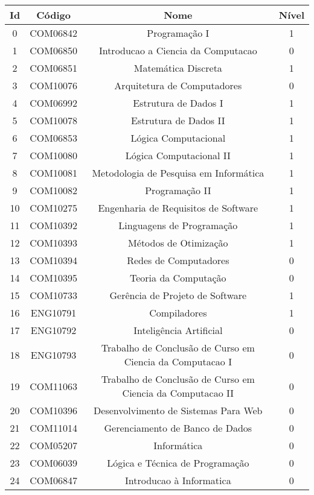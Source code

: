 \begin{apendices}
{\footnotesize
\begin{longtable}{|c|c|c|c|}
\hline
\textbf{Id} & \textbf{Código} & \textbf{Nome} & \textbf{Nível} \\ \hline
0 & COM06842 & Programação I & 1 \\ \hline
1 & COM06850 & Introducao a Ciencia da Computacao & 0 \\ \hline
2 & COM06851 & Matemática Discreta & 1 \\ \hline
3 & COM10076 & Arquitetura de Computadores & 0 \\ \hline
4 & COM06992 & Estrutura de Dados I & 1 \\ \hline
5 & COM10078 & Estrutura de Dados II & 1 \\ \hline
6 & COM06853 & Lógica Computacional & 1 \\ \hline
7 & COM10080 & Lógica Computacional II & 1 \\ \hline
8 & COM10081 & Metodologia de Pesquisa em Informática & 1 \\ \hline
9 & COM10082 & Programação II & 1 \\ \hline
10 & COM10275 & Engenharia de Requisitos de Software & 1 \\ \hline
11 & COM10392 & Linguagens de Programação & 1 \\ \hline
12 & COM10393 & Métodos de Otimização & 1 \\ \hline
13 & COM10394 & Redes de Computadores & 0 \\ \hline
14 & COM10395 & Teoria da Computação & 0 \\ \hline
15 & COM10733 & Gerência de Projeto de Software & 1 \\ \hline
16 & ENG10791 & Compiladores & 1 \\ \hline
17 & ENG10792 & Inteligência Artificial & 0 \\ \hline
18 & ENG10793 & Trabalho de Conclusão de Curso em Ciencia da Computacao I & 0 \\ \hline
19 & COM11063 & Trabalho de Conclusão de Curso em Ciencia da Computacao II & 0 \\ \hline
20 & COM10396 & Desenvolvimento de Sistemas Para Web & 0 \\ \hline
21 & COM11014 & Gerenciamento de Banco de Dados & 0 \\ \hline
22 & COM05207 & Informática & 0 \\ \hline
23 & COM06039 & Lógica e Técnica de Programação & 0 \\ \hline
24 & COM06847 & Introducao à Informatica & 0 \\ \hline

\end{longtable}}
\end{apendices}
